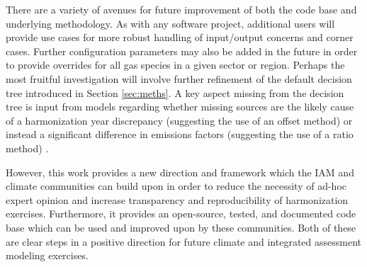 There are a variety of avenues for future improvement of both the 
code base and underlying methodology. As with any software project, additional
users will provide use cases for more robust handling of input/output concerns
and corner cases. Further configuration parameters may also be added in the
future in order to provide overrides for all gas species in a given sector or
region. Perhaps the most fruitful investigation will involve further refinement
of the default decision tree introduced in Section \ref{sec:meths}. A key aspect
missing from the decision tree is input from models regarding whether missing
sources are the likely cause of a harmonization year discrepancy (suggesting the
% 
% 
use of an offset method) or instead a significant difference in emissions
% 
% 
factors (suggesting the use of a ratio method) \cite{rogelj_discrepancies_2011}.

However, this work provides a new direction and framework which the IAM and
climate communities can build upon in order to reduce the necessity of ad-hoc
expert opinion and increase transparency and reproducibility of harmonization
exercises. Furthermore, it provides an open-source, tested, and documented code
base which can be used and improved upon by these communities. Both of these are
clear steps in a positive direction for future climate and integrated assessment
modeling exercises.
